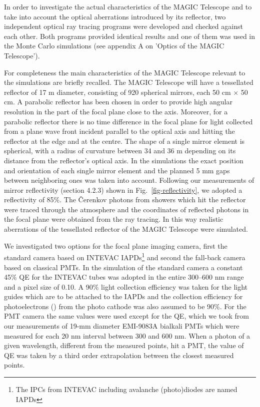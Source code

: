 In order to investigate the actual characteristics of the MAGIC
Telescope and to take into account the optical aberrations introduced
by its reflector, two independent optical ray tracing programs were
developed and checked against each other. Both
programs provided identical results and one of
them  was used
in the Monte Carlo simulations (see appendix A on 'Optics of the MAGIC Telescope'). 

For completeness the main characteristics of the MAGIC Telescope
relevant to the simulations are briefly recalled.  The MAGIC Telescope
will have a tessellated reflector of 17 m diameter, consisting of 920
spherical mirrors, each 50 cm $\times$ 50 cm.  A parabolic reflector
has been chosen in order to provide high angular resolution in the
part of the focal plane close to the axis. Moreover, for a parabolic
reflector there is no time difference in the focal plane for light
collected from a plane wave front incident parallel to the optical
axis and hitting the reflector at the edge and at the centre. The
shape of a single mirror element is spherical, with a radius of
curvature between 34 and 36 m depending on its distance from the
reflector's optical axis. In the simulations the exact position and
orientation of each single mirror element and the planned 5 mm gaps
between neighboring ones was taken into account. Following our
measurements of mirror reflectivity (section 4.2.3) shown in
Fig.~\ref{fig-reflectivity}, we adopted a reflectivity of 85\%. The
\v{C}erenkov photons from showers which hit the reflector were traced
through the atmosphere and the coordinates of reflected photons in the
focal plane were obtained from the ray tracing. In this way realistic
aberrations of the tessellated reflector of the MAGIC Telescope were
simulated.
        
We investigated two options for the focal plane imaging camera, first
the standard camera based on INTEVAC IAPDs\footnote{The IPCs from
INTEVAC including avalanche (photo)diodes are named IAPDs} and second
the fall-back camera based on classical PMTs. In the simulation of the
standard camera a constant 45\% QE for the INTEVAC tubes was adopted
in the entire 300--600 nm range and a pixel size of 0.10\tdeg. A 90\%
light collection efficiency was taken for the light guides which are
to be attached to the IAPDs and the collection efficiency for
photoelectrons (\phes) from the photo cathode was also assumed to be
90\%.  For the PMT camera the same values were used except for the QE,
which we took from our measurements of 19-mm diameter EMI-9083A
bialkali PMTs which were measured for each 20 nm interval between 300
and 600 nm.  When a photon of a given wavelength, different from the
measured points, hit a PMT, the value of QE was taken by a third order
extrapolation between the closest measured points.

